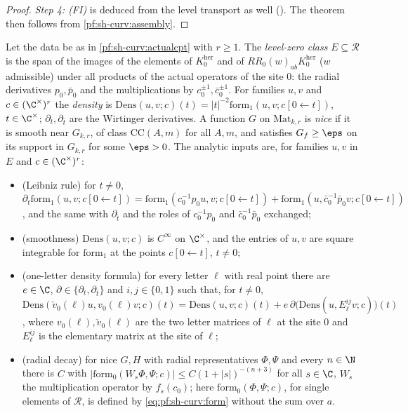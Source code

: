 \begin{proof}
\emph{Step 4: (FI)} is deduced from the level transport as well
(). The theorem then follows from
\cref{pf:sh-curv:assembly}.
\end{proof}

\begin{definition}\label{pf:sh-curv:anadef}
Let the data be as in \cref{pf:sh-curv:actualcpt} with $r\ge1$. The \emph{level-zero class} $E\subseteq\mathcal R$ is the span
of the images of the elements of $K^{\mathrm{her}}_0$ and of $RR_0(w)_{ab}K^{\mathrm{her}}_0$ ($w$ admissible) under all
products of the actual operators of the site $0$: the radial derivatives $p_0,\bar p_0$ and the multiplications by
$c_0^{\pm1},\bar c_0^{\pm1}$. For families $u,v$ and $c\in(\C^\times)^r$ the \emph{density} is
$\mathrm{Dens}(u,v;c)(t)=|t|^{-2}\mathrm{form}_1(u,v;c[0\leftarrow t])$, $t\in\C^\times$; $\partial_t,\partial_{\bar t}$ are the
Wirtinger derivatives. A function $G$ on $\mathrm{Mat}_{k,r}$ is \emph{nice} if it is smooth near $G_{k,r}$, of class
$\mathrm{CC}(A,m)$ for all $A,m$, and satisfies $G_f\ge\eps$ on its support in $G_{k,r}$ for some $\eps>0$. The analytic
inputs are, for families $u,v$ in $E$ and $c\in(\C^\times)^r$:
\begin{itemize}
\item[(LB)] (Leibniz rule) for $t\ne0$,
$\partial_t\mathrm{form}_1(u,v;c[0\leftarrow t])=\mathrm{form}_1(c_0^{-1}p_0u,v;c[0\leftarrow t])+\mathrm{form}_1(u,\bar c_0^{-1}
\bar p_0v;c[0\leftarrow t])$, and the same with $\partial_{\bar t}$ and the roles of $c_0^{-1}p_0$ and $\bar c_0^{-1}\bar p_0$
exchanged;
\item[(DS)] (smoothness) $\mathrm{Dens}(u,v;c)$ is $C^\infty$ on $\C^\times$, and the entries of $u,v$ are square integrable for
$\mathrm{form}_1$ at the points $c[0\leftarrow t]$, $t\ne0$;
\item[(OL)] (one-letter density formula) for every letter $\ell$ with real point there are $e\in\C$,
$\partial\in\{\partial_t,\partial_{\bar t}\}$ and $i,j\in\{0,1\}$ such that, for $t\ne0$,
$\mathrm{Dens}(\check v_0(\ell)u,v_0(\ell)v;c)(t)=\mathrm{Dens}(u,v;c)(t)+e\,\partial\bigl(\mathrm{Dens}(u,E^{ij}_{\ell}v;c)\bigr)(t)$,
where $v_0(\ell),\check v_0(\ell)$ are the two letter matrices of $\ell$ at the site $0$ and $E^{ij}_\ell$ is the elementary
matrix at the site of $\ell$;
\item[(RD)] (radial decay) for nice $G,H$ with radial representatives $\Phi,\Psi$ and every $n\in\N$ there is $C$ with
$|\mathrm{form}_0(W_s\Phi,\Psi;c)|\le C(1+|s|)^{-(n+3)}$ for all $s\in\C$, $W_s$ the multiplication operator by $f_s(c_0)$;
here $\mathrm{form}_0(\Phi,\Psi;c)$, for single elements of $\mathcal R$, is defined by \eqref{eq:pf:sh-curv:form} without the
sum over $a$.
\end{itemize}
\end{definition}

